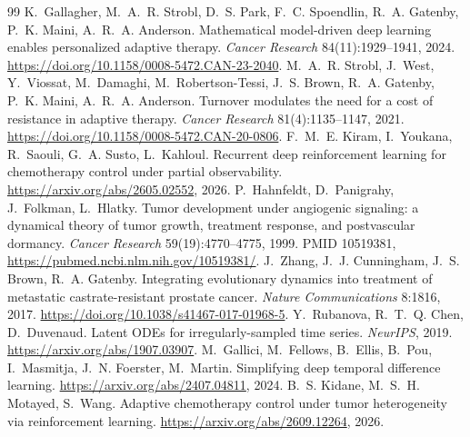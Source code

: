\documentclass[10pt]{article}
\begin{document}
\begin{thebibliography}{99}
 K.~Gallagher, M.~A.~R. Strobl, D.~S. Park,
F.~C. Spoendlin, R.~A. Gatenby, P.~K. Maini, A.~R.~A. Anderson. Mathematical
model-driven deep learning enables personalized adaptive therapy. \emph{Cancer
Research} 84(11):1929--1941, 2024. \url{https://doi.org/10.1158/0008-5472.CAN-23-2040}.
 M.~A.~R. Strobl, J.~West, Y.~Viossat, M.~Damaghi,
M.~Robertson-Tessi, J.~S. Brown, R.~A. Gatenby, P.~K. Maini, A.~R.~A. Anderson.
Turnover modulates the need for a cost of resistance in adaptive therapy.
\emph{Cancer Research} 81(4):1135--1147, 2021. \url{https://doi.org/10.1158/0008-5472.CAN-20-0806}.
 F.~M.~E. Kiram, I.~Youkana, R.~Saouli, G.~A. Susto,
L.~Kahloul. Recurrent deep reinforcement learning for chemotherapy control
under partial observability. \url{https://arxiv.org/abs/2605.02552}, 2026.
 P.~Hahnfeldt, D.~Panigrahy, J.~Folkman, L.~Hlatky.
Tumor development under angiogenic signaling: a dynamical theory of tumor
growth, treatment response, and postvascular dormancy. \emph{Cancer Research}
59(19):4770--4775, 1999. PMID 10519381, \url{https://pubmed.ncbi.nlm.nih.gov/10519381/}.
 J.~Zhang, J.~J. Cunningham, J.~S. Brown, R.~A. Gatenby.
Integrating evolutionary dynamics into treatment of metastatic
castrate-resistant prostate cancer. \emph{Nature Communications} 8:1816, 2017.
\url{https://doi.org/10.1038/s41467-017-01968-5}.
 Y.~Rubanova, R.~T.~Q. Chen, D.~Duvenaud. Latent ODEs
for irregularly-sampled time series. \emph{NeurIPS}, 2019. \url{https://arxiv.org/abs/1907.03907}.
 M.~Gallici, M.~Fellows, B.~Ellis, B.~Pou, I.~Masmitja,
J.~N. Foerster, M.~Martin. Simplifying deep temporal difference learning.
\url{https://arxiv.org/abs/2407.04811}, 2024.
 B.~S. Kidane, M.~S.~H. Motayed, S.~Wang. Adaptive
chemotherapy control under tumor heterogeneity via reinforcement learning.
\url{https://arxiv.org/abs/2609.12264}, 2026.

\end{thebibliography}
\end{document}
